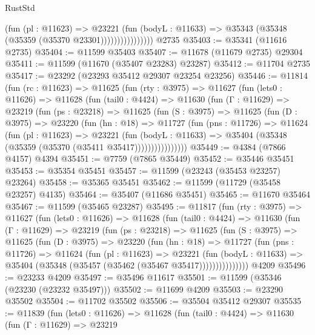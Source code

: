\begin{lexlean}{RustStd}
\begin{coremodule}
                          (fun (pl : @11623) =>
                          @23221
                            (fun (bodyL : @11633) =>
                            @35343 (@35348 (@35359 (@35370 @23301))))))))))))))))
    @2735
@35403 := @35341 (@11616 @2735)
@35404 := @11599 @35403
@35407 := @11678 (@11679 @2735) @29304
@35411 := @11599 (@11670 (@35407 @23283) @23287)
@35412 := @11704 @2735
@35417 := @23292 (@23293 @35412 @29307 @23254 @23256)
@35446 := @11814
    (fun (rc : @11623) =>
    @11625
      (fun (rty : @3975) =>
      @11627
        (fun (lets0 : @11626) =>
        @11628
          (fun (tail0 : @4424) =>
          @11630
            (fun (Γ : @11629) =>
            @23219
              (fun (ps : @23218) =>
              @11625
                (fun (S : @3975) =>
                @11625
                  (fun (D : @3975) =>
                  @23220
                    (fun (hn : @18) =>
                    @11727
                      (fun (pns : @11726) =>
                      @11624
                        (fun (pl : @11623) =>
                        @23221
                          (fun (bodyL : @11633) =>
                          @35404 (@35348 (@35359 (@35370 (@35411 @35417))))))))))))))))
@35449 := @4384 (@7866 @4157) @4394
@35451 := @7759 (@7865 @35449)
@35452 := @35446 @35451
@35453 := @35354 @35451
@35457 := @11599 (@23243 (@35453 @23257) @23264)
@35458 := @35365 @35451
@35462 := @11599 (@11729 (@35458 @23257) @4135)
@35464 := @35407 (@11686 @35451)
@35465 := @11670 @35464
@35467 := @11599 (@35465 @23287)
@35495 := @11817
    (fun (rty : @3975) =>
    @11627
      (fun (lets0 : @11626) =>
      @11628
        (fun (tail0 : @4424) =>
        @11630
          (fun (Γ : @11629) =>
          @23219
            (fun (ps : @23218) =>
            @11625
              (fun (S : @3975) =>
              @11625
                (fun (D : @3975) =>
                @23220
                  (fun (hn : @18) =>
                  @11727
                    (fun (pns : @11726) =>
                    @11624
                      (fun (pl : @11623) =>
                      @23221
                        (fun (bodyL : @11633) =>
                        @35404 (@35348 (@35457 (@35462 (@35467 @35417)))))))))))))))
    @4209
@35496 := @23233 @4209
@35497 := @35496 @11617
@35501 := @11599 (@35346 (@23230 (@23232 @35497)))
@35502 := @11699 @4209
@35503 := @23290 @35502
@35504 := @11702 @35502
@35506 := @35504 @35412 @29307
@35535 := @11839
    (fun (lets0 : @11626) =>
    @11628
      (fun (tail0 : @4424) =>
      @11630
        (fun (Γ : @11629) =>
        @23219

\end{coremodule}
\end{lexlean}
